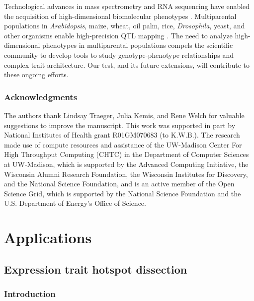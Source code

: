 \documentclass[oneside]{book}\usepackage[]{graphicx}\usepackage[]{color}
\begin{document}
Technological advances
in mass spectrometry and RNA sequencing have enabled the acquisition of
high-dimensional biomolecular phenotypes
\citep{ozsolak2011rna,han2012multi}. Multiparental populations in
\textit{Arabidopsis}, maize, wheat, oil palm, rice,
\textit{Drosophila}, yeast, and other organisms enable high-precision
QTL mapping \citep{yu2008genetic, tisne2017identification,
  stanley2017genetic, raghavan2017approaches, mackay2012drosophila,
  kover2009multiparent, cubillos2013high}. The need to analyze
high-dimensional phenotypes in multiparental populations compels the
scientific community to develop tools to study genotype-phenotype
relationships and complex trait architecture. Our test, and its future
extensions, will contribute to these ongoing efforts.




\subsection*{Acknowledgments}

The authors thank Lindsay Traeger, Julia Kemis, and Rene Welch for
valuable suggestions to improve the manuscript. This work was
supported in part by National Institutes of Health grant R01GM070683
(to K.W.B.). The research made use of compute resources and assistance
of the UW-Madison Center For High Throughput Computing (CHTC) in the
Department of Computer Sciences at UW-Madison, which is supported by
the Advanced Computing Initiative, the Wisconsin Alumni Research
Foundation, the Wisconsin Institutes for Discovery, and the National
Science Foundation, and is an active member of the Open Science Grid,
which is supported by the National Science Foundation and the U.S.
Department of Energy's Office of Science.

\chapter{Applications}
\section{Expression trait hotspot dissection}
\subsection{Introduction}
\end{document}
